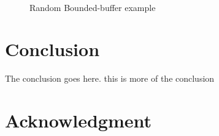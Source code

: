 \documentclass[preprint]{sigplanconf}
\begin{document}
%
%


\begin{figure}
  \centering
  \\
  \caption{Random Bounded-buffer example}
  \label{fig:rbb_exp}
\end{figure}



\section{Conclusion} \label{sec:conclu}
The conclusion goes here. this is more of the conclusion



\section*{Acknowledgment}
\end{document}
